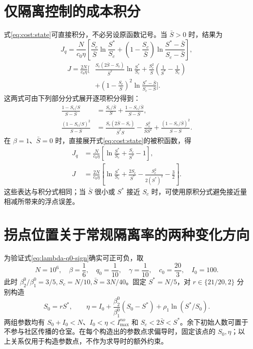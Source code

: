 \documentclass[lang=cn,a4paper,newtx]{elegantpaper}
\numberwithin{equation}{section}
\theoremstyle{plain}
\begin{document}
\FloatBarrier



\FloatBarrier

\section{仅隔离控制的成本积分}
\label{app:cost}
式\eqref{eq:cost:state}可直接积分，不必另设原函数记号。当 $\bar S>0$ 时，结果为
\begin{equation}
J_q=\frac{N}{c_0\eta}\left[
\frac{S_c}{\bar S}\ln\frac{S^*}{S_c}
+\left(1-\frac{S_c}{\bar S}\right)\ln\frac{S^*-\bar S}{S_c-\bar S}\right],
\label{eq:cost:closed-linear}
\end{equation}
\begin{equation}
\begin{split}
J=\frac{2N}{c_0\eta}\bigg[&
\frac{S_c(2\bar S-S_c)}{\bar S^2}\ln\frac{S^*}{S_c}
+\frac{S_c^2}{\bar S}\left(\frac1{S^*}-\frac1{S_c}\right)\\
&+\left(1-\frac{S_c}{\bar S}\right)^2
\ln\frac{S^*-\bar S}{S_c-\bar S}\bigg].
\end{split}
\label{eq:cost:closed}
\end{equation}
这两式可由下列部分分式展开逐项积分得到：
\begin{align*}
\frac{1-S_c/S}{S-\bar S}
&=\frac{S_c/\bar S}{S}
 +\frac{1-S_c/\bar S}{S-\bar S},\\
\frac{(1-S_c/S)^2}{S-\bar S}
&=\frac{S_c(2\bar S-S_c)}{\bar S^2S}
-\frac{S_c^2}{\bar S S^2}
+\frac{(1-S_c/\bar S)^2}{S-\bar S}.
\end{align*}
在 $\beta=1$、$\bar S=0$ 时，直接展开式\eqref{eq:cost:state}的被积函数，得
\begin{align}
J_q&=\frac{N}{c_0\eta}\left[\ln\frac{S^*}{S_c}+\frac{S_c}{S^*}-1\right],\\
J&=\frac{2N}{c_0\eta}\left[\ln\frac{S^*}{S_c}+\frac{2S_c}{S^*}
-\frac{S_c^2}{2(S^*)^2}-\frac32\right].
\end{align}
这些表达与积分式相同；当 $\bar S$ 很小或 $S^*$ 接近 $S_c$ 时，可使用原积分式避免接近量相减所带来的浮点误差。

\section{拐点位置关于常规隔离率的两种变化方向}
\label{app:lambda}
为验证式\eqref{eq:lambda-q0-sign}确实可正可负，取
\[
N=10^6,\quad \beta=\frac16,\quad q_0=\frac1{10},\quad
\gamma=\frac1{10},\quad c_0=\frac{20}{3},\quad I_0=100.
\]
此时 $\beta_2^0/\beta_1^0=3/5,S_c=N/10,\bar S=3N/40$。固定 $S^*=N/5$，对 $r\in\{21/20,2\}$ 分别构造
\[
S_0=rS^*,\qquad
\eta=I_0+\frac{\beta_2^0}{\beta_1^0}(S_0-S^*)+\rho_1\ln(S^*/S_0).
\]
两组参数均有 $S_0+I_0<N$、$I_0<\eta<I_{\max}^{no}$ 和 $S_c<2\bar S<S^*$。余下初始人数可置于不参与社区传播的仓室。在每个构造出的参数点求偏导时，固定该点的 $S_0,\eta$；以上关系仅用于构造参数点，不作为求导时的额外约束。
\end{document}
